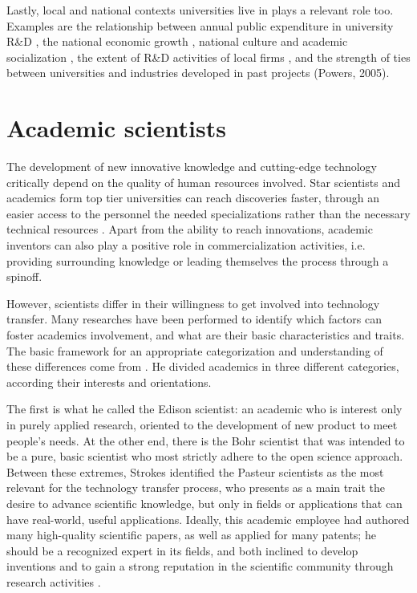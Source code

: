 Lastly, local and national contexts universities live in plays a relevant role too. Examples are the relationship between annual public expenditure in university R\&D \citep{OShea2005}, the national economic growth \citep{Siegel2003a}, national culture and academic socialization \citep{Bercovitz2006}, the extent of R\&D activities of local firms \citep{Siegel2003a}, and the strength of ties between universities and industries developed in past projects (Powers, 2005). 

\section{Academic scientists}

The development of new innovative knowledge and cutting-edge technology critically depend on the quality of human resources involved. Star scientists and academics form top tier universities can reach discoveries faster, through an easier access to the personnel the needed specializations rather than the necessary technical resources \citep{OShea2005}. Apart from the ability to reach innovations, academic inventors can also play a positive role in commercialization activities, i.e. providing surrounding knowledge or leading themselves the process through a spinoff.

However, scientists differ in their willingness to get involved into technology transfer. Many researches have been performed to identify which factors can foster academics involvement, and what are their basic characteristics and traits. The basic framework for an appropriate categorization and understanding of these differences come from \citet{Stokes1997}. He divided academics in three different categories, according their interests and orientations. 

The first is what he called the Edison scientist: an academic who is interest only in purely applied research, oriented to the development of new product to meet people's needs. At the other end, there is the Bohr scientist that was intended to be a pure, basic scientist who most strictly adhere to the open science approach. Between these extremes, Strokes identified the Pasteur scientists as the most relevant for the technology transfer process, who presents as a main trait the desire to advance scientific knowledge, but only in fields or applications that can have real-world, useful applications. Ideally, this academic employee had authored many high-quality scientific papers, as well as applied for many patents; he should be a recognized expert in its fields, and both inclined to develop inventions and to gain a strong reputation in the scientific community through research activities \citep{Baba2009}.

